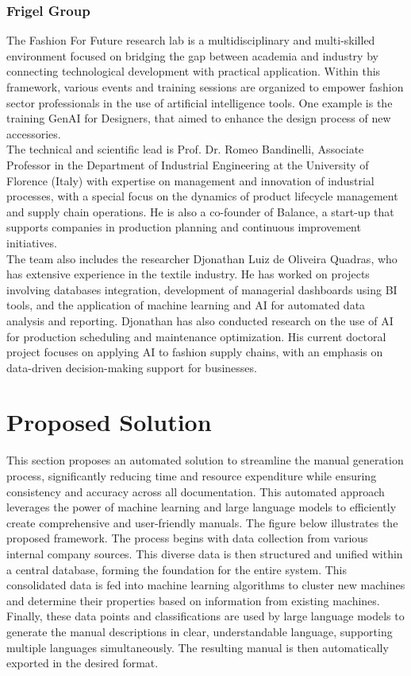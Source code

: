 \documentclass{article}%
\begin{document}
%
\subsubsection{Frigel Group}%
\label{ssubsec:FrigelGroup}%
The Fashion For Future research lab is a multidisciplinary and multi-skilled environment focused on bridging the gap between academia and industry by connecting technological development with practical application. Within this framework, various events and training sessions are organized to empower fashion sector professionals in the use of artificial intelligence tools. One example is the training GenAI for Designers, that aimed to enhance the design process of new accessories. \\ 
The technical and scientific lead is Prof. Dr. Romeo Bandinelli, Associate Professor in the Department of Industrial Engineering at the University of Florence (Italy) with expertise on management and innovation of industrial processes, with a special focus on the dynamics of product lifecycle management and supply chain operations. He is also a co-founder of Balance, a start-up that supports companies in production planning and continuous improvement initiatives. \\ 
The team also includes the researcher Djonathan Luiz de Oliveira Quadras, who has extensive experience in the textile industry. He has worked on projects involving databases integration, development of managerial dashboards using BI tools, and the application of machine learning and AI for automated data analysis and reporting. Djonathan has also conducted research on the use of AI for production scheduling and maintenance optimization. His current doctoral project focuses on applying AI to fashion supply chains, with an emphasis on data-driven decision-making support for businesses. \\ 

%
\newpage%
\section{Proposed Solution}%
\label{sec:ProposedSolution}%
This section proposes an automated solution to streamline the manual generation process, significantly reducing time and resource expenditure while ensuring consistency and accuracy across all documentation.  This automated approach leverages the power of machine learning and large language models to efficiently create comprehensive and user{-}friendly manuals.\newline%
The figure below illustrates the proposed framework.  The process begins with data collection from various internal company sources. This diverse data is then structured and unified within a central database, forming the foundation for the entire system.  This consolidated data is fed into machine learning algorithms to cluster new machines and determine their properties based on information from existing machines.  Finally, these data points and classifications are used by large language models to generate the manual descriptions in clear, understandable language, supporting multiple languages simultaneously. The resulting manual is then automatically exported in the desired format.%
\end{document}
